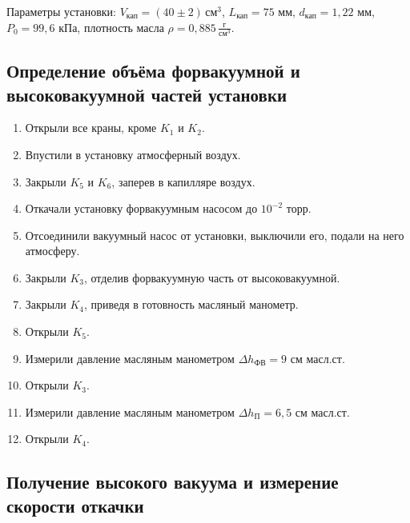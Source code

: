 \documentclass[12pt]{article}
\begin{document}
	Параметры установки: $V_\text{кап}=(40\pm 2) \,\text{см}^3$, $L_\text{кап}=75$ мм, $d_\text{кап}=1{,}22$ мм, $P_0=99{,}6$ кПа, плотность масла $\rho=0{,}885\,\frac{\text{г}}{\text{см}^3}$.
	
	\subsection*{Определение объёма форвакуумной и высоковакуумной частей установки}
	
	\begin{enumerate}
		\item Открыли все краны, кроме $K_1$ и $K_2$.
		\item Впустили в установку атмосферный воздух.
		\item Закрыли $K_5$ и $K_6$, заперев в капилляре воздух.
		\item Откачали установку форвакуумным насосом до $10^{-2}$ торр.
		\item Отсоединили вакуумный насос от установки, выключили его, подали на него атмосферу.
		\item Закрыли $K_3$, отделив форвакуумную часть от высоковакуумной.
		\item Закрыли $K_4$, приведя в готовность масляный манометр.
		\item Открыли $K_5$.
		\item Измерили давление масляным манометром $\Delta h_\text{ФВ}=9$ см масл.ст.
		\item Открыли $K_3$.
		\item Измерили давление масляным манометром $\Delta h_\text{П}=6{,}5$ см масл.ст.
		\item Открыли $K_4$.
	\end{enumerate}
	
	\subsection*{Получение высокого вакуума и измерение скорости откачки}
	
\end{document}

